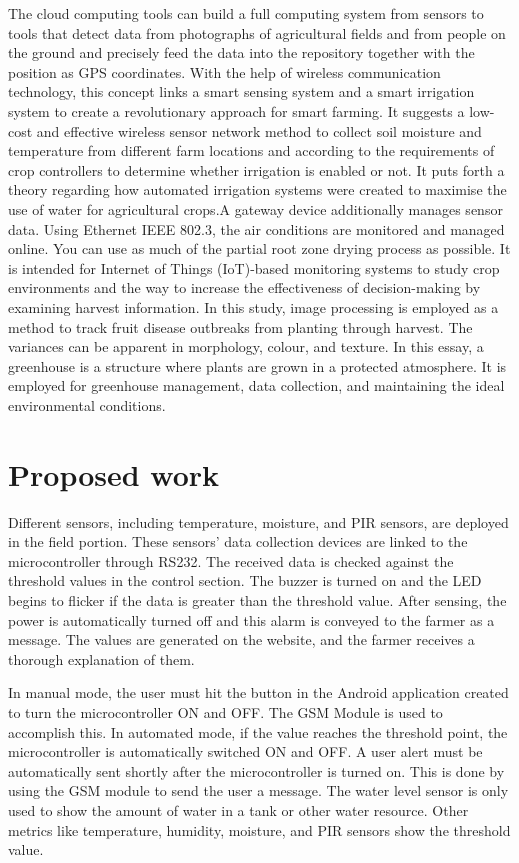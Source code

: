 \documentclass{wsdcr}
\begin{document}
The cloud computing tools can build a full computing system from sensors to tools that detect data from photographs of agricultural fields and from people on the ground and precisely feed the data into the repository together with the position as GPS coordinates. With the help of wireless communication technology, this concept links a smart sensing system and a smart irrigation system to create a revolutionary approach for smart farming. It suggests a low-cost and effective wireless sensor network method to collect soil moisture and temperature from different farm locations and according to the requirements of crop controllers to determine whether irrigation is enabled or not.  It puts forth a theory regarding how automated irrigation systems were created to maximise the use of water for agricultural crops.A gateway device additionally manages sensor data. Using Ethernet IEEE 802.3, the air conditions are monitored and managed online. You can use as much of the partial root zone drying process as possible. It is intended for Internet of Things (IoT)-based monitoring systems to study crop environments and the way to increase the effectiveness of decision-making by examining harvest information. In this study, image processing is employed as a method to track fruit disease outbreaks from planting through harvest. The variances can be apparent in morphology, colour, and texture. In this essay, a greenhouse is a structure where plants are grown in a protected atmosphere. It is employed for greenhouse management, data collection, and maintaining the ideal environmental conditions.

\section{Proposed work}
Different sensors, including temperature, moisture, and PIR sensors, are deployed in the field portion.
These sensors' data collection devices are linked to the microcontroller through RS232.
The received data is checked against the threshold values in the control section. The buzzer is turned on and the LED begins to flicker if the data is greater than the threshold value. After sensing, the power is automatically turned off and this alarm is conveyed to the farmer as a message. The values are generated on the website, and the farmer receives a thorough explanation of them.

In manual mode, the user must hit the button in the Android application created to turn the microcontroller ON and OFF. The GSM Module is used to accomplish this.
In automated mode, if the value reaches the threshold point, the microcontroller is automatically switched ON and OFF. A user alert must be automatically sent shortly after the microcontroller is turned on. This is done by using the GSM module to send the user a message.
The water level sensor is only used to show the amount of water in a tank or other water resource. Other metrics like temperature, humidity, moisture, and PIR sensors show the threshold value.
\end{document}
